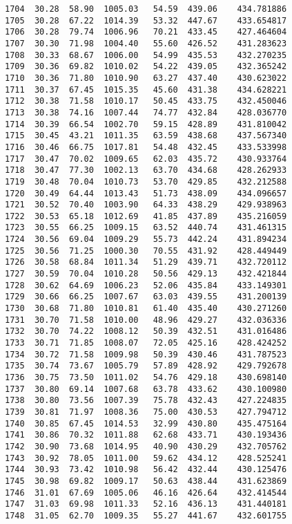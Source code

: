 \documentclass[11pt]{article}
\begin{document}
\begin{tcolorbox}[breakable, size=fbox, boxrule=.5pt, pad at break*=1mm, opacityfill=0]
\begin{Verbatim}[commandchars=\\\{\}]
1704  30.28  58.90  1005.03   54.59  439.06    434.781886
1705  30.28  67.22  1014.39   53.32  447.67    433.654817
1706  30.28  79.74  1006.96   70.21  433.45    427.464604
1707  30.30  71.98  1004.40   55.60  426.52    431.283623
1708  30.33  68.67  1006.00   54.99  435.53    432.270235
1709  30.36  69.82  1010.02   54.22  439.05    432.365242
1710  30.36  71.80  1010.90   63.27  437.40    430.623022
1711  30.37  67.45  1015.35   45.60  431.38    434.628221
1712  30.38  71.58  1010.17   50.45  433.75    432.450046
1713  30.38  74.16  1007.44   74.77  432.84    428.036770
1714  30.39  66.54  1002.70   59.15  428.89    431.810042
1715  30.45  43.21  1011.35   63.59  438.68    437.567340
1716  30.46  66.75  1017.81   54.48  432.45    433.533998
1717  30.47  70.02  1009.65   62.03  435.72    430.933764
1718  30.47  77.30  1002.13   63.70  434.68    428.262933
1719  30.48  70.04  1010.73   53.70  429.85    432.212588
1720  30.49  64.44  1013.43   51.73  438.09    434.096657
1721  30.52  70.40  1003.90   64.33  438.29    429.938963
1722  30.53  65.18  1012.69   41.85  437.89    435.216059
1723  30.55  66.25  1009.15   63.52  440.74    431.461315
1724  30.56  69.04  1009.29   55.73  442.24    431.894234
1725  30.56  71.25  1000.30   70.55  431.92    428.449449
1726  30.58  68.84  1011.34   51.29  439.71    432.720112
1727  30.59  70.04  1010.28   50.56  429.13    432.421844
1728  30.62  64.69  1006.23   52.06  435.84    433.149301
1729  30.66  66.25  1007.67   63.03  439.55    431.200139
1730  30.68  71.80  1010.81   61.40  435.40    430.271260
1731  30.70  71.58  1010.00   48.96  429.27    432.036336
1732  30.70  74.22  1008.12   50.39  432.51    431.016486
1733  30.71  71.85  1008.07   72.05  425.16    428.424252
1734  30.72  71.58  1009.98   50.39  430.46    431.787523
1735  30.74  73.67  1005.79   57.89  428.92    429.792678
1736  30.75  73.50  1011.02   54.76  429.18    430.698140
1737  30.80  69.14  1007.68   63.78  433.62    430.100980
1738  30.80  73.56  1007.39   75.78  432.43    427.224835
1739  30.81  71.97  1008.36   75.00  430.53    427.794712
1740  30.85  67.45  1014.53   32.99  430.80    435.475164
1741  30.86  70.32  1011.88   62.68  433.71    430.193436
1742  30.90  73.68  1014.95   40.90  430.29    432.705762
1743  30.92  78.05  1011.00   59.62  434.12    428.525241
1744  30.93  73.42  1010.98   56.42  432.44    430.125476
1745  30.98  69.82  1009.17   50.63  438.44    431.623869
1746  31.01  67.69  1005.06   46.16  426.64    432.414544
1747  31.03  69.98  1011.33   52.16  436.13    431.440181
1748  31.05  62.70  1009.35   55.27  441.67    432.601755

\end{Verbatim}
\end{tcolorbox}
\end{document}
